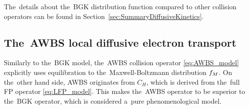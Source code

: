 The~details about the~BGK distribution function compared to other
collision operators can be found in Section~\ref{sec:SummaryDiffusiveKinetics}.

\subsection{The~AWBS local diffusive electron transport}
\label{sec:AWBSDiffusiveRegime}
Similarly to the~BGK model, the~AWBS collision operator \ref{eq:AWBS_model} 
explicitly uses equilibration to the~Maxwell-Boltzmann distribution $f_M$. 
On the~other hand side, AWBS originates from $C_H$, which is derived from 
the~full FP operator \eqref{eq:LFP_model}. This makes the~AWBS operator 
to be superior to the~BGK operator, which is considered a~pure
phenomenological model.

